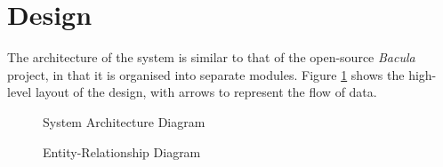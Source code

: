 \section{Design}

The architecture of the system is similar to that of the open-source
\emph{Bacula} project, in that it is organised into separate modules. Figure
\ref{fig:architecture} shows the high-level layout of the design, with arrows
to represent the flow of data.

\begin{figure}[h]
    \begin{center}
        
    \end{center}
    \caption{System Architecture Diagram}
    \label{fig:architecture}
\end{figure}

\begin{figure}[h]
    \begin{center}
        
    \end{center}
    \caption{Entity-Relationship Diagram}
    \label{fig:erd}
\end{figure}

